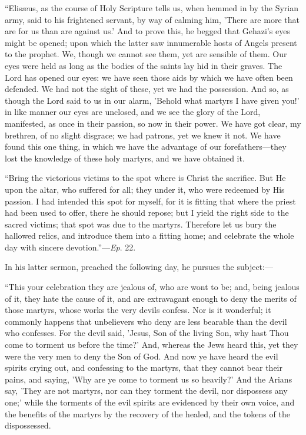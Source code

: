 ``Elisæus, as the course of Holy Scripture tells us, when
hemmed in by the Syrian army, said to his frightened servant, by way
of calming him, 'There are more that are for us than are against us.'
And to prove this, he begged that Gehazi's eyes might be opened; upon
which the latter saw innumerable hosts of Angels present to the
prophet. We, though we cannot see them, yet are sensible of them. Our
eyes were held as long as the bodies of the saints lay hid in their
graves. The Lord has opened our eyes: we have seen those aids by which
we have often been defended. We had not the sight of these, yet we had
the possession. And so, as though the Lord said to us in our alarm,
'Behold what martyrs I have given you!' in like manner our eyes are
unclosed, and we see the glory of the Lord, manifested, as once in
their passion, so now in their power. We have got clear, my brethren,
of no slight disgrace; we had patrons, yet we knew it not. We have
found this one thing, in which we have the advantage of our
forefathers—they lost the knowledge of these holy martyrs, and we
have obtained it.

``Bring the victorious victims to the spot where is Christ the
sacrifice. But He upon the altar, who suffered for all; they under it,
who were redeemed by His passion. I had intended this spot for myself,
for it is fitting that where the priest had been used to offer, there
he should repose; but I yield the right side to the sacred victims;
that spot was due to the martyrs. Therefore let us bury the hallowed
relics, and introduce them into a fitting home; and celebrate the
whole day with sincere devotion.''—\emph{Ep}. 22.

In his latter sermon, preached the following day, he pursues the
subject:—

``This your celebration they are jealous of, who are wont to
be; and, being jealous of it, they hate the cause of it, and are
extravagant enough to deny the merits of those martyrs, whose works
the very devils confess. Nor is it wonderful; it commonly happens that
unbelievers who deny are less bearable than the devil who confesses.
For the devil said, 'Jesus, Son of the living Son, why hast Thou come
to torment us before the time?' And, whereas the Jews heard this, yet
they were the very men to deny the Son of God. And now ye have heard
the evil spirits crying out, and confessing to the martyrs, that they cannot bear their pains, and saying, 'Why
are ye come to torment us so heavily?' And the Arians say, 'They are
not martyrs, nor can they torment the devil, nor dispossess any one;'
while the torments of the evil spirits are evidenced by their own
voice, and the benefits of the martyrs by the recovery of the healed,
and the tokens of the dispossessed.

